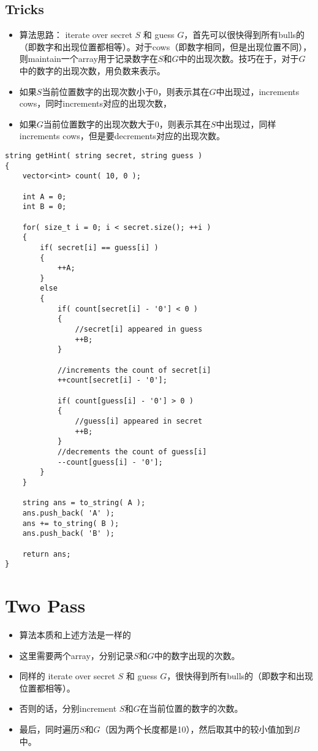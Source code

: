 \subsection{Tricks}
\begin{itemize}
\item 算法思路： iterate over secret $S$ 和 guess $G$，首先可以很快得到所有bulls的（即数字和出现位置都相等）。对于cows（即数字相同，但是出现位置不同），则maintain一个array用于记录数字在$S$和$G$中的出现次数。技巧在于，对于$G$中的数字的出现次数，用负数来表示。
\item 如果$S$当前位置数字的出现次数小于0，则表示其在$G$中出现过，increments cows，同时increments对应的出现次数，
\item 如果$G$当前位置数字的出现次数大于0，则表示其在$S$中出现过，同样increments cows，但是要decrements对应的出现次数。
\end{itemize}

\setcounter{lstlisting}{0}
\begin{lstlisting}[style=customc, caption={Counts}]
string getHint( string secret, string guess )
{
    vector<int> count( 10, 0 );

    int A = 0;
    int B = 0;

    for( size_t i = 0; i < secret.size(); ++i )
    {
        if( secret[i] == guess[i] )
        {
            ++A;
        }
        else
        {
            if( count[secret[i] - '0'] < 0 )
            {
                //secret[i] appeared in guess
                ++B;
            }

            //increments the count of secret[i]
            ++count[secret[i] - '0'];

            if( count[guess[i] - '0'] > 0 )
            {
                //guess[i] appeared in secret
                ++B;
            }
            //decrements the count of guess[i]
            --count[guess[i] - '0'];
        }
    }

    string ans = to_string( A );
    ans.push_back( 'A' );
    ans += to_string( B );
    ans.push_back( 'B' );

    return ans;
}
\end{lstlisting}
\section{Two Pass}
\begin{itemize}
\item 算法本质和上述方法是一样的
\item 这里需要两个array，分别记录$S$和$G$中的数字出现的次数。
\item 同样的 iterate over secret $S$ 和 guess $G$，很快得到所有bulls的（即数字和出现位置都相等）。
\item 否则的话，分别increment $S$和$G$在当前位置的数字的次数。
\item 最后，同时遍历$S$和$G$（因为两个长度都是10），然后取其中的较小值加到$B$中。
\end{itemize}

